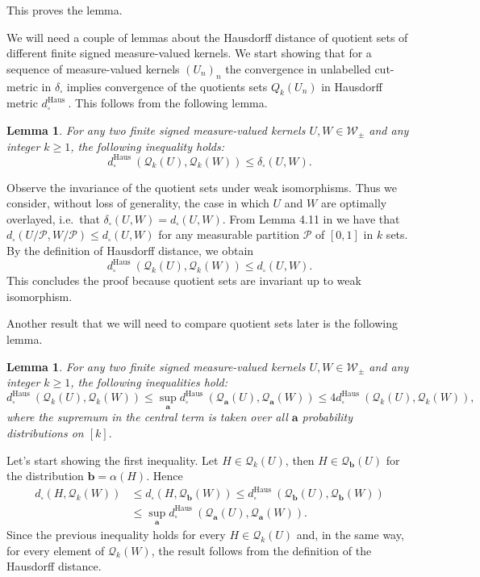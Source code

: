 \documentclass[11pt]{article}
\newtheorem{lemma}[theorem]{Lemma}
\newcommand{\signed}{\pm}
\newcommand{\Kernel}{\mathcal{W}_{\signed}}
\begin{document}
This proves the lemma.
\endproof

We will need a couple of lemmas about the Hausdorff distance of quotient sets of different finite signed measure-valued kernels. We start showing that for a sequence of measure-valued kernels $(U_n)_n$ the convergence in unlabelled cut-metric in $\delta_{\square}$ implies convergence of the quotients sets ${Q}_k(U_n)$ in Hausdorff metric $d_{\square}^{\text {Haus }}.$ This follows from the following lemma.

\begin{lemma}\label{LemmMetricconvImplQuotient}
For any two finite signed measure-valued kernels  $U,W\in \Kernel$ and any integer $k \geq 1$, the following inequality holds:
$$
d_{\square}^{\text {Haus }}\left(\mathcal{Q}_k(U), \mathcal{Q}_k(W)\right) \leq \delta_{\square}(U, W) .
$$
\end{lemma} \proof Observe the invariance of the quotient sets under weak isomorphisms. Thus we consider, without loss of generality, the case in which $U$ and $W$ are optimally overlayed, i.e.\ that $\delta_{\square}(U, W)=d_{\square}\left(U, W\right)$. From Lemma 4.11 in \cite{abraham2023probabilitygraphons} %
we have that $d_{\square}(U / \mathcal{P}, W / \mathcal{P}) \leq d_{\square}\left(U, W\right)$ for any measurable partition $\mathcal{P}$ of $[0,1]$ in $k$ sets. By the definition of Hausdorff distance, we obtain
$$
d_{\square}^{\text {Haus }}\left(\mathcal{Q}_k(U), \mathcal{Q}_k(W)\right) \leq  d_{\square}\left(U, W\right).
$$
This concludes the proof because quotient sets are invariant up to weak isomorphism.
\endproof

Another result that we will need to compare quotient sets later is the following lemma. 

\begin{lemma}\label{LemmaineqQuot}
For any two finite signed measure-valued kernels  $U,W\in \Kernel$ and any integer $k \geq 1$, the following inequalities hold:
$$
d_{\square}^{\text {Haus }}\left(\mathcal{Q}_k(U), \mathcal{Q}_k(W)\right) \leq \sup _{\mathbf{a}} d_{\square}^{\text {Haus }}\left(\mathcal{Q}_{\mathbf{a}}(U), \mathcal{Q}_{\mathbf{a}}(W)\right) \leq 4 d_{\square}^{\text {Haus }}\left(\mathcal{Q}_k(U), \mathcal{Q}_k(W)\right),
$$
where the supremum in the central term is taken over all $\mathbf{a}$ probability distributions on $[k].$
\end{lemma} \proof Let's start showing the first inequality. Let $H \in \mathcal{Q}_k(U)$, then $H \in \mathcal{Q}_{\mathbf{b}}(U)$ for the distribution $\mathbf{b}=\alpha(H).$ Hence
$$
\begin{aligned}
d_{\square}\left(H, \mathcal{Q}_k(W)\right) & \leq d_{\square}\left(H, \mathcal{Q}_{\mathbf{b}}(W)\right) \leq d_{\square}^{\text {Haus }}\left(\mathcal{Q}_{\mathbf{b}}(U), \mathcal{Q}_{\mathbf{b}}(W)\right) \\
& \leq \sup _{\mathbf{a}} d_{\square}^{\text {Haus }}\left(\mathcal{Q}_{\mathbf{a}}(U), \mathcal{Q}_{\mathbf{a}}(W)\right) .
\end{aligned}
$$
Since the previous inequality holds for every $H \in \mathcal{Q}_k(U)$ and, in the same way, for every element of $\mathcal{Q}_k(W)$, the result follows from the definition of the Hausdorff distance.
\end{document}
